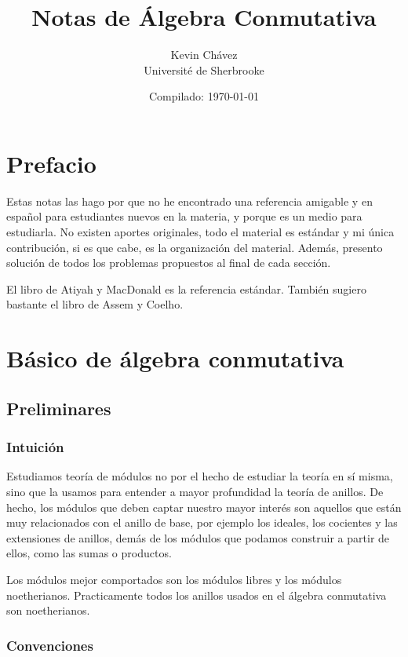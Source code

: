 \documentclass[b5paper,10pt]{book}
\title{Notas de Álgebra Conmutativa}
\author{Kevin Chávez\\ Université de Sherbrooke}
\date{Compilado: \today}
\begin{document}
\pagestyle{empty}
\maketitle 
\tableofcontents
\pagestyle{plain}

\chapter*{Prefacio}

Estas notas las hago por que no he encontrado una referencia
amigable y en español para estudiantes nuevos en la materia,
y porque es un medio para estudiarla.
No existen aportes originales, todo el material es estándar
y mi única contribución, si es que cabe, es la organización 
del material.
Además, presento solución de todos los problemas propuestos 
al final de cada sección.

El libro de Atiyah y MacDonald es la referencia estándar.
También sugiero bastante el libro de Assem y Coelho.

\chapter{Básico de álgebra conmutativa}

\section{Preliminares}

\subsection{Intuición}

Estudiamos teoría de módulos no por el hecho de estudiar la teoría en sí misma,
sino que la usamos para entender a mayor profundidad la teoría de anillos.
De hecho, los módulos que deben captar nuestro mayor interés 
son aquellos que están muy relacionados con el anillo de base,
por ejemplo los ideales, los cocientes y las extensiones de anillos,
demás de los módulos que podamos construir a partir de ellos, como las sumas o productos.

Los módulos mejor comportados son los módulos libres
y los módulos noetherianos.
Practicamente todos los anillos usados en el álgebra conmutativa son
noetherianos.

\subsection{Convenciones}
\end{document}
